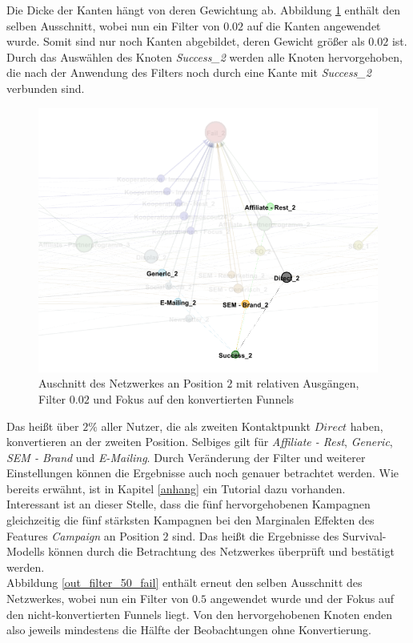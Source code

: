 Die Dicke der Kanten hängt von deren Gewichtung ab. Abbildung \ref{out_filter_2_succ} enthält den selben Ausschnitt, wobei nun ein Filter von $0.02$ auf die Kanten angewendet wurde. Somit sind nur noch Kanten abgebildet, deren Gewicht größer als $0.02$ ist. Durch das Auswählen des Knoten \textit{Success\_2} werden alle Knoten hervorgehoben, die nach der Anwendung des Filters noch durch eine Kante mit \textit{Success\_2} verbunden sind.
\begin{figure}[H]
	\centering\includegraphics[scale=0.35]{out_filter_2_succ.png}\caption[Relative Ausgänge mit Filter $0.02$]{Auschnitt des Netzwerkes an Position $2$ mit relativen Ausgängen, Filter $0.02$ und Fokus auf den konvertierten Funnels}\label{out_filter_2_succ}
\end{figure}
Das heißt über $2 \%$ aller Nutzer, die als zweiten Kontaktpunkt $Direct$ haben, konvertieren an der zweiten Position. Selbiges gilt für \textit{Affiliate - Rest}, \textit{Generic}, \textit{SEM - Brand} und \textit{E-Mailing}. Durch Veränderung der Filter und weiterer Einstellungen können die Ergebnisse auch noch genauer betrachtet werden. Wie bereits erwähnt, ist in Kapitel \ref{anhang} ein Tutorial dazu vorhanden.\\
Interessant ist an dieser Stelle, dass die fünf hervorgehobenen Kampagnen gleichzeitig die fünf stärksten Kampagnen bei den Marginalen Effekten des Features \textit{Campaign} an Position $2$ sind. Das heißt die Ergebnisse des Survival-Modells können durch die Betrachtung des Netzwerkes überprüft und bestätigt werden.\\
Abbildung \ref{out_filter_50_fail} enthält erneut den selben Ausschnitt des Netzwerkes, wobei nun ein Filter von $0.5$ angewendet wurde und der Fokus auf den nicht-konvertierten Funnels liegt. Von den hervorgehobenen Knoten enden also jeweils mindestens die Hälfte der Beobachtungen ohne Konvertierung.\\
